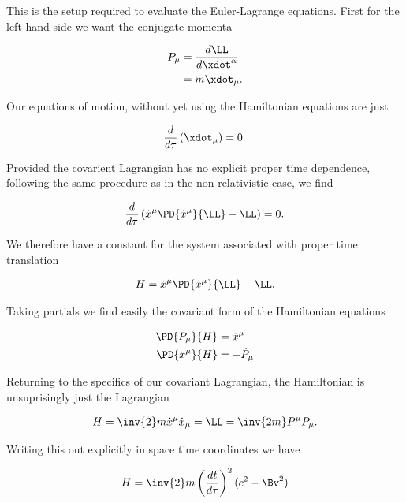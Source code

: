 This is the setup required to evaluate the Euler-Lagrange equations.  First for the left hand side we want the conjugate momenta

\begin{align*}
P_\mu 
&= \frac{d \LL}{d \xdot^\alpha} \\
&= m \xdot_\mu.
\end{align*}

Our equations of motion, without yet using the Hamiltonian equations are just

\begin{align}\label{eqn:hamiltonian:qqq2x}
\frac{d}{d\tau} \left( \xdot_\mu \right) = 0.
\end{align}

Provided the covarient Lagrangian has no explicit proper time dependence, following the same procedure as in the non-relativistic case, we find

\begin{align}\label{eqn:hamiltonian:foo2r}
\frac{d}{d\tau} \left( \dot{x}^\mu \PD{\dot{x}^\mu}{\LL} -\LL \right) = 0.
\end{align}

We therefore have a constant for the system associated with proper time translation

\begin{align}\label{eqn:hamiltonian:foo2q}
H = \dot{x}^\mu \PD{\dot{x}^\mu}{\LL} -\LL.
\end{align}

Taking partials we find easily the covariant form of the Hamiltonian equations

\begin{align}\label{eqn:hamiltonian:qqq30}
\PD{P_\mu}{H} &= \dot{x}^\mu \\
\PD{x^\mu}{H} &= -\dot{P}_\mu 
\end{align}

Returning to the specifics of our covariant Lagrangian, the Hamiltonian is unsuprisingly just the Lagrangian

\begin{align}\label{eqn:hamiltonian:foo2s}
H = \inv{2} m \dot{x}^\mu \dot{x}_\mu = \LL = \inv{2m} P^\mu P_\mu.
\end{align}

Writing this out explicitly in space time coordinates we have

\begin{align}\label{eqn:hamiltonian:qqq10}
H = \inv{2} m
\left( \frac{dt}{d\tau} \right)^2
(c^2 - \Bv^2)
\end{align}

